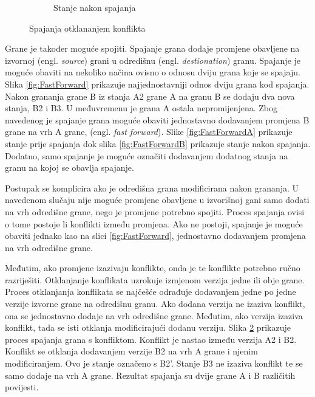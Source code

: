 \documentclass[times, utf8, diplomski, numeric]{fer}
\newcommand{\eng}[1]{(engl. \textit{#1})}
\begin{document}
\begin{appendices}
\begin{figure}[b!]
\begin{subfigure}{.49\textwidth}
\caption{Stanje nakon spajanja}
\label{fig:ConflictB}
\end{subfigure}
\caption{Spajanja otklananjem konflikta}
\label{fig:Conflict}
\end{figure}

Grane je također moguće spojiti. Spajanje grana dodaje promjene obavljene na izvornoj \eng{source} grani u odredišnu \eng{destionation} granu. Spajanje je moguće obaviti na nekoliko načina ovisno o odnosu dviju grana koje se spajaju. Slika \ref{fig:FastForward} prikazuje najjednostavniji odnos dviju grana kod spajanja. Nakon grananja grane B iz stanja A2 grane A na granu B se dodaju dva nova stanja, B2 i B3. U međuvremenu je grana A ostala nepromijenjena. Zbog navedenog je spajanje grana moguće obaviti jednostavno dodavanjem promjena B grane na vrh A grane, \eng{fast forward}. Slike \ref{fig:FastForwardA} prikazuje stanje prije spajanja dok slika \ref{fig:FastForwardB} prikazuje stanje nakon spajanja. Dodatno, samo spajanje je moguće označiti dodavanjem dodatnog stanja na granu na kojoj se obavlja spajanje.

Postupak se komplicira ako je odredišna grana modificirana nakon grananja. U navedenom slučaju nije moguće promjene obavljene u izvorišnoj gani samo dodati na vrh odredišne grane, nego je promjene potrebno spojiti. Proces spajanja ovisi o tome postoje li konflikti između promjena. Ako ne postoji, spajanje je moguće obaviti jednako kao na slici \ref{fig:FastForward}, jednostavno dodavanjem promjena na vrh odredišne grane.

Međutim, ako promjene izazivaju konflikte, onda je te konflikte potrebno ručno razriješiti. Otklanjanje konflikata uzrokuje izmjenom verzija jedne ili obje grane. Proces otklanjanja konflikata se najčešće odrađuje dodavanjem jedne po jedne verzije izvorne grane na odredišnu granu. Ako dodana verzija ne izaziva konflikt, ona se jednostavno dodaje na vrh odredišne grane. Međutim, ako verzija izaziva konflikt, tada se isti otklanja modificirajući dodanu verziju. Slika \ref{fig:Conflict} prikazuje proces spajanja grana s konfliktom. Konflikt je nastao između verzija A2 i B2. Konflikt se otklanja dodavanjem verzije B2 na vrh A grane i njenim modificiranjem. Ovo je stanje označeno s B2'. Stanje B3 ne izaziva konflikt te se samo dodaje na vrh A grane. Rezultat spajanja su dvije grane A i B različitih povijesti.


\end{appendices}
\end{document}
